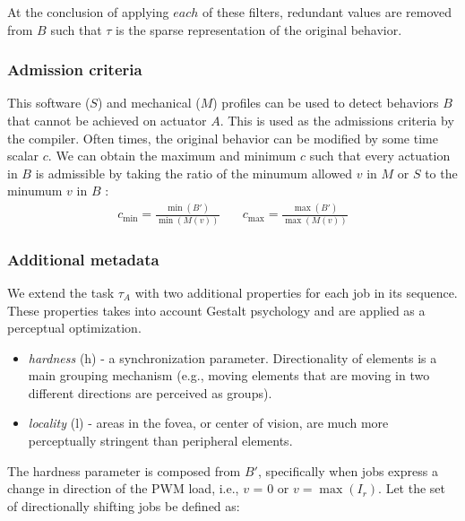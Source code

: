 \documentclass{sigchi}
\begin{document}
    At the conclusion of applying $each$ of these filters, redundant values are removed from $B$ such that $\tau$ is the sparse representation of the original behavior.

    \subsubsection{Admission criteria}
    This software ($S$) and mechanical ($M$) profiles can be used to detect behaviors $B$ that cannot be achieved on actuator $A$. 
    This is used as the admissions criteria by the compiler. Often times, the original behavior can be modified by some time scalar $c$.  We can obtain the maximum and minimum $c$ such that every actuation in $B$ is admissible by taking the ratio of the minumum allowed $v$ in $M$ or $S$ to the minumum $v$ in $B$ : 
    \begin{equation}
    \begin{split}
        c_{\min } =  \frac{\min (B')}{\min (M(v))}
      \end{split}
    \quad
      \begin{split}
       c_{\max } =  \frac{\max (B')}{\max (M(v))}
    \end{split}
    \end{equation}
   
    \subsubsection{Additional metadata}
    We extend the task $\tau_A$ with two additional properties for each job in its sequence. These properties takes into account Gestalt psychology and are applied as a perceptual optimization.
    \begin{itemize} 
    \item \textit{hardness} (h) - a synchronization parameter. Directionality of elements is a main grouping mechanism (e.g., moving elements that are moving in two different directions are perceived as groups). 
    \item \textit{locality} (l) - areas in the fovea, or center of vision, are much more perceptually stringent than peripheral elements. 
    \end{itemize}
  
    The hardness parameter is composed from $B'$, specifically when jobs express a change in direction of the PWM load, i.e., $v$ = 0 or $v = \max(I_r)$. Let the set of directionally shifting jobs be defined as:
\end{document}
